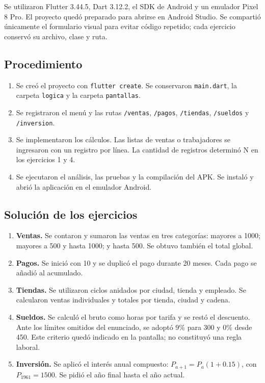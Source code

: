 \documentclass[12pt,letterpaper]{article}
\begin{document}
Se utilizaron Flutter 3.44.5, Dart 3.12.2, el SDK de Android y un emulador Pixel 8 Pro. El proyecto quedó preparado para abrirse en Android Studio. Se compartió únicamente el formulario visual para evitar código repetido; cada ejercicio conservó su archivo, clase y ruta.

\subsection{Procedimiento}
\begin{enumerate}
\item Se creó el proyecto con \texttt{flutter create}. Se conservaron \texttt{main.dart}, la carpeta \texttt{logica} y la carpeta \texttt{pantallas}.
\item Se registraron el menú y las rutas \texttt{/ventas}, \texttt{/pagos}, \texttt{/tiendas}, \texttt{/sueldos} y \texttt{/inversion}.
\item Se implementaron los cálculos. Las listas de ventas o trabajadores se ingresaron con un registro por línea. La cantidad de registros determinó N en los ejercicios 1 y 4.
\item Se ejecutaron el análisis, las pruebas y la compilación del APK. Se instaló y abrió la aplicación en el emulador Android.
\end{enumerate}

\subsection{Solución de los ejercicios}
\begin{enumerate}
\item \textbf{Ventas.} Se contaron y sumaron las ventas en tres categorías: mayores a 1000; mayores a 500 y hasta 1000; y hasta 500. Se obtuvo también el total global.
\item \textbf{Pagos.} Se inició con 10 y se duplicó el pago durante 20 meses. Cada pago se añadió al acumulado.
\item \textbf{Tiendas.} Se utilizaron ciclos anidados por ciudad, tienda y empleado. Se calcularon ventas individuales y totales por tienda, ciudad y cadena.
\item \textbf{Sueldos.} Se calculó el bruto como horas por tarifa y se restó el descuento. Ante los límites omitidos del enunciado, se adoptó 9\% para 300 y 0\% desde 450. Este criterio quedó indicado en la pantalla; no constituyó una regla laboral.
\item \textbf{Inversión.} Se aplicó el interés anual compuesto: $P_{a+1}=P_a(1+0.15)$, con $P_{1961}=1500$. Se pidió el año final hasta el año actual.
\end{enumerate}
\end{document}
